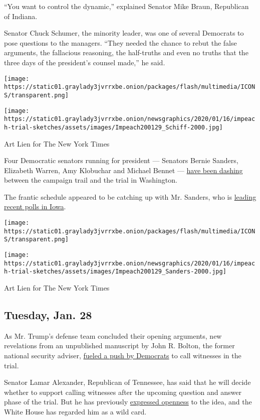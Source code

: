 ``You want to control the dynamic,'' explained Senator Mike Braun,
Republican of Indiana.

Senator Chuck Schumer, the minority leader, was one of several Democrats
to pose questions to the managers. ``They needed the chance to rebut the
false arguments, the fallacious reasoning, the half-truths and even no
truths that the three days of the president's counsel made,'' he said.

\texttt{[image: https://static01.graylady3jvrrxbe.onion/packages/flash/multimedia/ICONS/transparent.png]}

\texttt{[image: https://static01.graylady3jvrrxbe.onion/newsgraphics/2020/01/16/impeach-trial-sketches/assets/images/Impeach200129\_Schiff-2000.jpg]}

Art Lien for The New York Times

Four Democratic senators running for president --- Senators Bernie
Sanders, Elizabeth Warren, Amy Klobuchar and Michael Bennet ---
\href{https://www.nytimes3xbfgragh.onion/2020/01/25/us/politics/joe-biden-cindy-axne-iowa.html}{have
been dashing} between the campaign trail and the trial in Washington.

The frantic schedule appeared to be catching up with Mr. Sanders, who is
\href{https://www.nytimes3xbfgragh.onion/2020/01/27/us/politics/iowa-democrats-bernie-sanders.html}{leading
recent polls in Iowa}.

\texttt{[image: https://static01.graylady3jvrrxbe.onion/packages/flash/multimedia/ICONS/transparent.png]}

\texttt{[image: https://static01.graylady3jvrrxbe.onion/newsgraphics/2020/01/16/impeach-trial-sketches/assets/images/Impeach200129\_Sanders-2000.jpg]}

Art Lien for The New York Times

\hypertarget{tuesday-jan-28}{%
\subsection{Tuesday, Jan. 28}\label{tuesday-jan-28}}

As Mr. Trump's defense team concluded their opening arguments, new
revelations from an unpublished manuscript by John R. Bolton, the former
national security adviser,
\href{https://www.nytimes3xbfgragh.onion/2020/01/27/us/politics/john-bolton-impeachment-witness.html}{fueled
a push by Democrats} to call witnesses in the trial.

Senator Lamar Alexander, Republican of Tennessee, has said that he will
decide whether to support calling witnesses after the upcoming question
and answer phase of the trial. But he has previously
\href{https://www.nytimes3xbfgragh.onion/2020/01/25/us/politics/lamar-alexander-witnesses-impeachment.html}{expressed
openness} to the idea, and the White House has regarded him as a wild
card.

